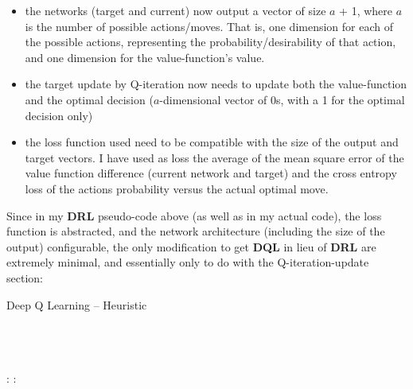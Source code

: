\begin{itemize}
\item the networks (target and current) now output a vector of size $a$ + 1, where $a$ is the number of possible actions/moves. That is, one dimension for each of the possible actions, representing the probability/desirability of that action, and one dimension for the value-function's value.
\item the target update by Q-iteration now needs to update both the value-function and the optimal decision ($a$-dimensional vector of 0s, with a 1 for the optimal decision only)
\item the loss function used need to be compatible with the size of the output and target vectors. I have used as loss the average of the mean square error of the value function difference (current network and target) and the cross entropy loss of the actions probability versus the actual optimal move.
\end{itemize}
Since in my \textbf{DRL} pseudo-code above (as well as in my actual code), the loss function is abstracted, and the network architecture (including the size of the output) configurable, the only modification to get \textbf{DQL} in lieu of \textbf{DRL} are extremely minimal, and essentially only to do with the Q-iteration-update section:



\teal
\begin{algorithm}[H]
\caption{Deep Q Learning -- Heuristic}\label{alg:TheoryDQL}
\begin{algorithmic}


\\ \black
\\ \black
\\ \black
            \Else:
                    :
		\EndIf
		\EndFor
	\EndIf
\\ \black
	\EndFor
\EndWhile
\EndFunction
\end{algorithmic}
\end{algorithm}
\black

